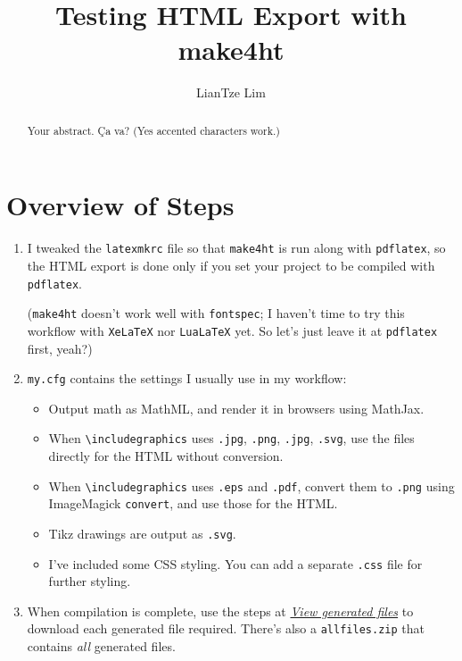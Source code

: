 \documentclass[a4paper,11pt]{article}
\title{Testing HTML Export with make4ht}
\author{LianTze Lim}
\date{}
\begin{document}
\maketitle
\tableofcontents


\begin{abstract}
Your abstract. Ça va? (Yes accented characters work.)
\end{abstract}

\section{Overview of Steps}

\begin{enumerate}
\item I tweaked the \verb|latexmkrc| file so that \verb|make4ht| is run along with \verb|pdflatex|, so the HTML export is done only if you set your project to be compiled with \verb|pdflatex|.

(\verb|make4ht| doesn't work well with \verb|fontspec|; I haven't time to try this workflow with \verb|XeLaTeX| nor \verb|LuaLaTeX| yet. So let's just leave it at \verb|pdflatex| first, yeah?)

\item \verb|my.cfg| contains the settings I usually use in my workflow:
  \begin{itemize}
  \item Output math as MathML, and render it in browsers using MathJax.
  \item When \verb|\includegraphics| uses \verb|.jpg|, \verb|.png|, \verb|.jpg|, \verb|.svg|, use the files directly for the HTML without conversion.
  \item When \verb|\includegraphics| uses \verb|.eps| and \verb|.pdf|, convert them to \verb|.png| using ImageMagick \verb|convert|, and use those for the HTML.

  \item Tikz drawings are output as \verb|.svg|.
  
  \item I've included some CSS styling. You can add a separate \verb|.css| file for further styling.
  \end{itemize}
  
\item When compilation is complete, use the steps at \href{https://www.overleaf.com/learn/how-to/View_generated_files}{\emph{View generated files}} to download each generated file required. There's also a \texttt{allfiles.zip} that contains \emph{all} generated files.
\end{enumerate}
\end{document}
